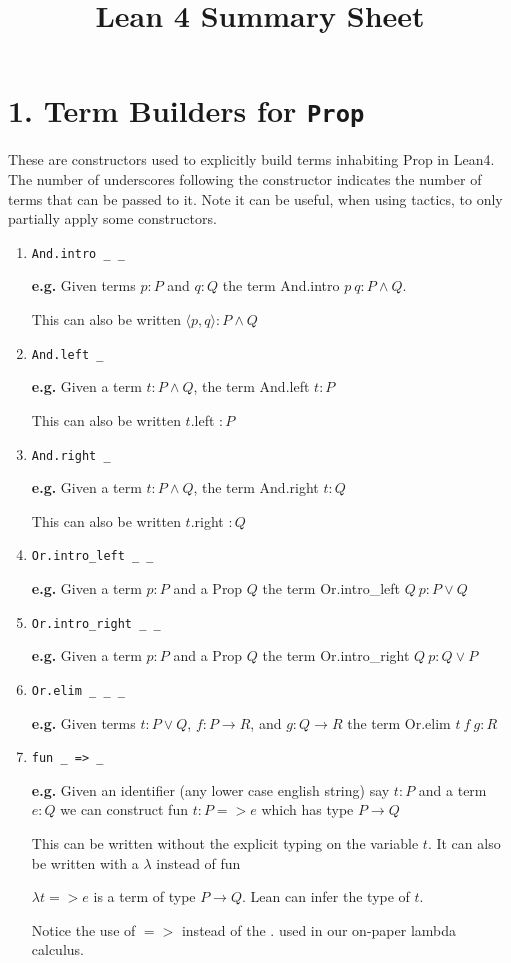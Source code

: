 \documentclass[12pt]{article}
\title{Lean 4 Summary Sheet}
\author{}
\date{}
\begin{document}
\maketitle

\section*{1. Term Builders for \texttt{Prop}}
These are constructors used to explicitly build terms inhabiting Prop in Lean4. The number of underscores following the constructor indicates the number of terms that can be passed to it. Note it can be useful, when using tactics, to only partially apply some constructors.

\begin{enumerate}
  \item \texttt{And.intro \_ \_}
  
  {\bf e.g.} Given terms $p:P$ and $q:Q$ the term And.intro $p \ q : P \land Q$.  
  
  This can also be written $\langle p,q \rangle : P \land Q$
  
  \item \texttt{And.left \_}
  
  {\bf e.g.} Given a term $t : P \land Q$, the term And.left $t : P$  
  
  This can also be written $t$.left $: P$
  
  \item \texttt{And.right \_}
  
  {\bf e.g.} Given a term $t : P \land Q$, the term And.right $t : Q$   
  
  This can also be written $t$.right $: Q$
  
  \item \texttt{Or.intro\_left \_ \_}
  
  {\bf e.g.} Given a term $p:P$ and a Prop $Q$ the term Or.intro\_left $Q \ p : P \lor Q$
  
  \item \texttt{Or.intro\_right \_ \_}
  
 {\bf e.g.} Given a term $p:P$ and a Prop $Q$ the term Or.intro\_right $Q \ p : Q \lor P$   
  
  \item \texttt{Or.elim \_ \_ \_}
  
  {\bf e.g.} Given terms $t : P \lor Q$, $f: P \to R$, and $g: Q \to R$ the term Or.elim $t \ f \ g : R$ 
  
  \item \texttt{fun \_ => \_}
  
  {\bf e.g.} Given an identifier (any lower case english string) say $t : P$ and a term $e : Q$ we can construct fun $t : P => e$ which has type $P \to Q$ 
  
  This can be written without the explicit typing on the variable $t$. It can also be written with a $\lambda$ instead of fun 
  
  $\lambda t => e$ is a term of type $P \to Q$. Lean can infer the type of $t$. 
  
  Notice the use of $=>$ instead of the $.$ used in our on-paper lambda calculus. 
  
\end{enumerate}
\end{document}

